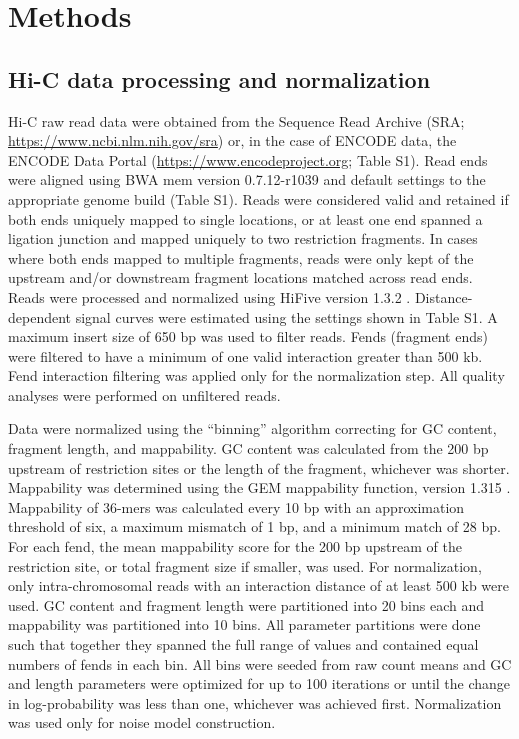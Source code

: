 \section{Methods}

\subsection{Hi-C data processing and normalization}

Hi-C raw read data were obtained from the Sequence Read Archive (SRA; \url{https://www.ncbi.nlm.nih.gov/sra}) or, in the case of ENCODE data, the ENCODE Data Portal (\url{https://www.encodeproject.org}; Table S1). Read ends were aligned using BWA mem version 0.7.12-r1039 and default settings \cite{li_sequence_2009} to the appropriate genome build (Table S1). Reads were considered valid and retained if both ends uniquely mapped to single locations, or at least one end spanned a ligation junction and mapped uniquely to two restriction fragments. In cases where both ends mapped to multiple fragments, reads were only kept of the upstream and/or downstream fragment locations matched across read ends. Reads were processed and normalized using HiFive version 1.3.2 \cite{sauria_hifive:_2015}. Distance-dependent signal curves were estimated using the settings shown in Table S1. A maximum insert size of 650 bp was used to filter reads. Fends (fragment ends) were filtered to have a minimum of one valid interaction greater than 500 kb. Fend interaction filtering was applied only for the normalization step. All quality analyses were performed on unfiltered reads.

Data were normalized using the ``binning'' algorithm correcting for GC content, fragment length, and mappability. GC content was calculated from the 200 bp upstream of restriction sites or the length of the fragment, whichever was shorter. Mappability was determined using the GEM mappability function, version 1.315 \cite{koehler_uniqueome:_2011}. Mappability of 36-mers was calculated every 10 bp with an approximation threshold of six, a maximum mismatch of 1 bp, and a minimum match of 28 bp. For each fend, the mean mappability score for the 200 bp upstream of the restriction site, or total fragment size if smaller, was used. For normalization, only intra-chromosomal reads with an interaction distance of at least 500 kb were used. GC content and fragment length were partitioned into 20 bins each and mappability was partitioned into 10 bins. All parameter partitions were done such that together they spanned the full range of values and contained equal numbers of fends in each bin. All bins were seeded from raw count means and GC and length parameters were optimized for up to 100 iterations or until the change in log-probability was less than one, whichever was achieved first. Normalization was used only for noise model construction.

